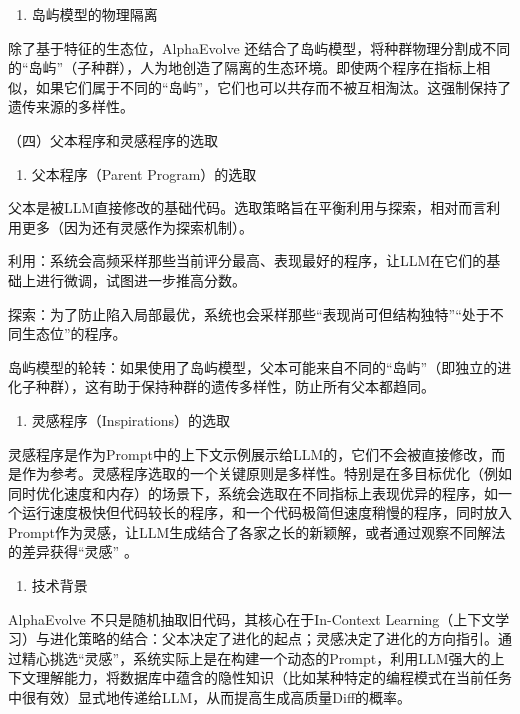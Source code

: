\begin{enumerate}
\def\labelenumi{\arabic{enumi}.}
\setcounter{enumi}{2}
\tightlist
\item
  岛屿模型的物理隔离
\end{enumerate}

除了基于特征的生态位，AlphaEvolve 还结合了岛屿模型，将种群物理分割成不同的``岛屿''（子种群），人为地创造了隔离的生态环境。即使两个程序在指标上相似，如果它们属于不同的``岛屿''，它们也可以共存而不被互相淘汰。这强制保持了遗传来源的多样性。

（四）父本程序和灵感程序的选取

\begin{enumerate}
\def\labelenumi{\arabic{enumi}.}
\tightlist
\item
  父本程序（Parent Program）的选取
\end{enumerate}

父本是被LLM直接修改的基础代码。选取策略旨在平衡利用与探索，相对而言利用更多（因为还有灵感作为探索机制）。

利用：系统会高频采样那些当前评分最高、表现最好的程序，让LLM在它们的基础上进行微调，试图进一步推高分数。

探索：为了防止陷入局部最优，系统也会采样那些``表现尚可但结构独特''``处于不同生态位''的程序。

岛屿模型的轮转：如果使用了岛屿模型，父本可能来自不同的``岛屿''（即独立的进化子种群），这有助于保持种群的遗传多样性，防止所有父本都趋同。

\begin{enumerate}
\def\labelenumi{\arabic{enumi}.}
\setcounter{enumi}{1}
\tightlist
\item
  灵感程序（Inspirations）的选取
\end{enumerate}

灵感程序是作为Prompt中的上下文示例展示给LLM的，它们不会被直接修改，而是作为参考。灵感程序选取的一个关键原则是多样性。特别是在多目标优化（例如同时优化速度和内存）的场景下，系统会选取在不同指标上表现优异的程序，如一个运行速度极快但代码较长的程序，和一个代码极简但速度稍慢的程序，同时放入Prompt作为灵感，让LLM生成结合了各家之长的新颖解，或者通过观察不同解法的差异获得``灵感'' 。

\begin{enumerate}
\def\labelenumi{\arabic{enumi}.}
\setcounter{enumi}{2}
\tightlist
\item
  技术背景
\end{enumerate}

AlphaEvolve 不只是随机抽取旧代码，其核心在于In-Context Learning（上下文学习）与进化策略的结合：父本决定了进化的起点；灵感决定了进化的方向指引。通过精心挑选``灵感''，系统实际上是在构建一个动态的Prompt，利用LLM强大的上下文理解能力，将数据库中蕴含的隐性知识（比如某种特定的编程模式在当前任务中很有效）显式地传递给LLM，从而提高生成高质量Diff的概率。

